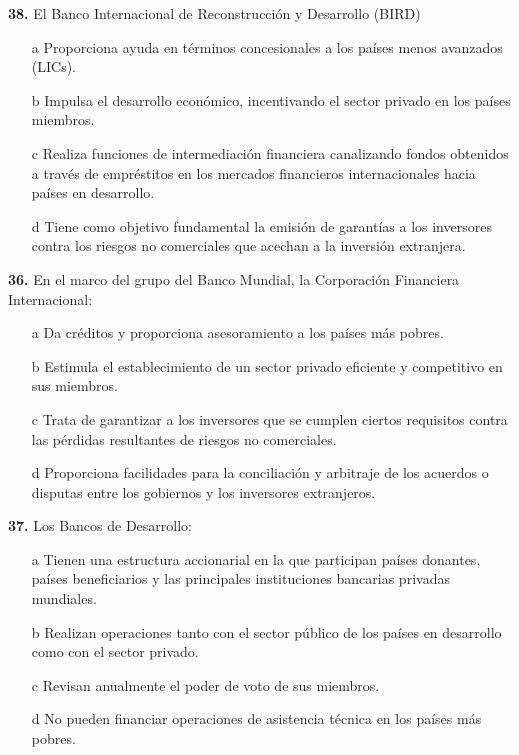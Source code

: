 \documentclass{nuevotema}
\begin{document}

\textbf{38.} El Banco Internacional de Reconstrucción y Desarrollo (BIRD)

\begin{itemize}
	\item[a] Proporciona ayuda en términos concesionales a los países menos avanzados (LICs).
	\item[b] Impulsa el desarrollo económico, incentivando el sector privado en los países miembros.
	\item[c] Realiza funciones de intermediación financiera canalizando fondos obtenidos a través de empréstitos en los mercados financieros internacionales hacia países en desarrollo.
	\item[d] Tiene como objetivo fundamental la emisión de garantías a los inversores contra los riesgos no comerciales que acechan a la inversión extranjera.
\end{itemize}


\textbf{36.} En el marco del grupo del Banco Mundial, la Corporación Financiera Internacional:

\begin{itemize}
	\item[a] Da créditos y proporciona asesoramiento a los países más pobres.
	\item[b] Estimula el establecimiento de un sector privado eficiente y competitivo en sus miembros.
	\item[c] Trata de garantizar a los inversores que se cumplen ciertos requisitos contra las pérdidas resultantes de riesgos no comerciales.
	\item[d] Proporciona facilidades para la conciliación y arbitraje de los acuerdos o disputas entre los gobiernos y los inversores extranjeros.
\end{itemize}

\textbf{37.} Los Bancos de Desarrollo:

\begin{itemize}
	\item[a] Tienen una estructura accionarial en la que participan países donantes, países beneficiarios y las principales instituciones bancarias privadas mundiales.
	\item[b] Realizan operaciones tanto con el sector público de los países en desarrollo como con el sector privado.
	\item[c] Revisan anualmente el poder de voto de sus miembros.
	\item[d] No pueden financiar operaciones de asistencia técnica en los países más pobres.
\end{itemize}
\end{document}
